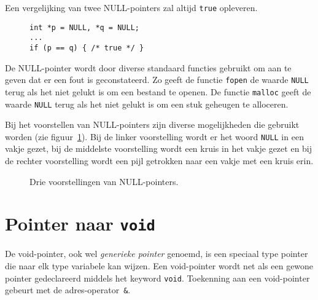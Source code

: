 Een vergelijking van twee NULL-pointers zal altijd \texttt{true} opleveren.

\begin{figure}[H]
\begin{lstlisting}[caption=Vergelijken van twee NULL-pointers.]
int *p = NULL, *q = NULL;
...
if (p == q) { /* true */ }
\end{lstlisting}
\end{figure}

De NULL-pointer wordt door diverse standaard functies gebruikt om aan te geven dat er een fout is geconstateerd. Zo geeft de functie \texttt{fopen} de waarde \texttt{NULL} terug als het niet gelukt is om een bestand te openen. De functie \texttt{malloc} geeft de waarde \texttt{NULL} terug als het niet gelukt is om een stuk geheugen te alloceren.

Bij het voorstellen van NULL-pointers zijn diverse mogelijkheden die gebruikt worden (zie figuur~\ref{fig:poinullpointers}). Bij de linker voorstelling wordt er het woord \texttt{NULL} in een vakje gezet, bij de middelste voorstelling wordt een kruis in het vakje gezet en bij de rechter voorstelling wordt een pijl getrokken naar een vakje met een kruis erin.

\begin{figure}[!ht]
\centering
{}
\caption{Drie voorstellingen van NULL-pointers.}
\label{fig:poinullpointers}
\end{figure}


\section{Pointer naar \texttt{void}}
\label{sec:pointertovoid}

De void-pointer, ook wel \textsl{generieke pointer} genoemd, is een speciaal type pointer die naar elk type variabele kan wijzen. Een void-pointer wordt net als een gewone pointer gedeclareerd middels het keyword \texttt{void}. Toekenning aan een void-pointer gebeurt met de adres-operator~\texttt{\&}.

